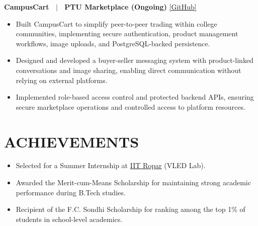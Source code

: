 \documentclass[10.5pt,letterpaper]{article}
\begin{document}
\textbf{CampusCart \ $|$ \ PTU Marketplace (Ongoing)} \href{https://github.com/amankr32/CampusCart}{[GitHub]}
\begin{itemize}
  \item Built CampusCart to simplify peer-to-peer trading within college communities, implementing secure authentication, product management workflows, image uploads, and PostgreSQL-backed persistence.
  \item Designed and developed a buyer-seller messaging system with product-linked conversations and image sharing, enabling direct communication without relying on external platforms.
  \item Implemented role-based access control and protected backend APIs, ensuring secure marketplace operations and controlled access to platform resources.
\end{itemize}

\section*{ACHIEVEMENTS}
\begin{itemize}
    \item Selected for a Summer Internship at \href{https://www.iitrpr.ac.in/}{IIT Ropar} (VLED Lab).
    \item Awarded the Merit-cum-Means Scholarship for maintaining strong academic performance during B.Tech studies.
    \item Recipient of the F.C. Sondhi Scholarship for ranking among the top 1\% of students in school-level academics.
\end{itemize}
\end{document}
